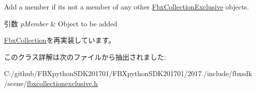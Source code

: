 Add a member if it\textquotesingle{}s not a member of any other \hyperlink{class_fbx_collection_exclusive}{Fbx\+Collection\+Exclusive} objects. 
\begin{DoxyParams}{引数}
{\em p\+Member} & Object to be added \\
\hline
\end{DoxyParams}


\hyperlink{class_fbx_collection_a8f9bfa57454dda20ef75dd4f27761a15}{Fbx\+Collection}を再実装しています。



このクラス詳解は次のファイルから抽出されました\+:\begin{DoxyCompactItemize}
\item 
C\+:/github/\+F\+B\+Xpython\+S\+D\+K201701/\+F\+B\+Xpython\+S\+D\+K201701/2017./include/fbxsdk/scene/\hyperlink{fbxcollectionexclusive_8h}{fbxcollectionexclusive.\+h}\end{DoxyCompactItemize}
